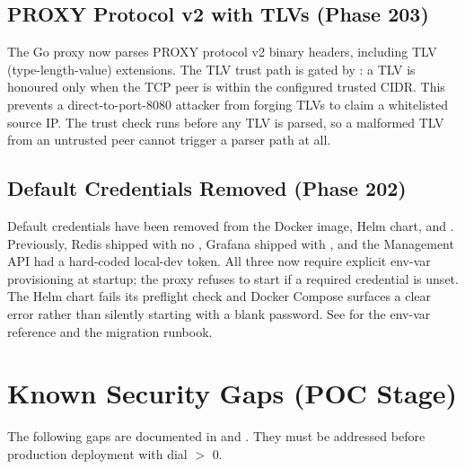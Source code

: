 \subsection{PROXY Protocol v2 with TLVs (Phase 203)}

The Go proxy now parses PROXY protocol v2 binary headers, including TLV
(type-length-value) extensions. The TLV trust path is gated by
: a TLV is honoured only when
the TCP peer is within the configured trusted CIDR. This prevents a
direct-to-port-8080 attacker from forging TLVs to claim a whitelisted source
IP. The trust check runs before any TLV is parsed, so a malformed TLV from an
untrusted peer cannot trigger a parser path at all.

\subsection{Default Credentials Removed (Phase 202)}

Default credentials have been removed from the Docker image, Helm chart, and
. Previously, Redis shipped with no ,
Grafana shipped with , and the Management API had a hard-coded
local-dev token. All three now require explicit env-var provisioning at startup;
the proxy refuses to start if a required credential is unset. The Helm chart
fails its preflight check and Docker Compose surfaces a clear error rather than
silently starting with a blank password. See 
for the env-var reference and the migration runbook.

\section{Known Security Gaps (POC Stage)}

The following gaps are documented in  and
. They must be addressed
before production deployment with dial $>$ 0.

